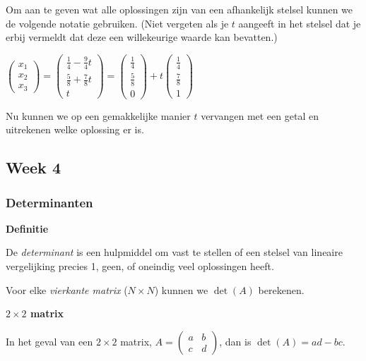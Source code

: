 \documentclass[11pt]{article}
\begin{document}
    Om aan te geven wat alle oplossingen zijn van een afhankelijk stelsel
kunnen we de volgende notatie gebruiken. (Niet vergeten als je \(t\)
aangeeft in het stelsel dat je erbij vermeldt dat deze een willekeurige
waarde kan bevatten.)

\(\begin{pmatrix}x_1 \\ x_2 \\ x_3 \end{pmatrix} = \begin{pmatrix} \frac{1}{4}-\frac{9}{4}t \\ \frac{5}{8}+\frac{7}{8}t \\ t \end{pmatrix} = \begin{pmatrix}\frac{1}{4}\\\frac{5}{8}\\0\end{pmatrix}+t\begin{pmatrix}\frac{1}{4}\\\frac{7}{8}\\1\end{pmatrix}\)

Nu kunnen we op een gemakkelijke manier \(t\) vervangen met een getal en
uitrekenen welke oplossing er is.

    \hypertarget{week-4}{%
\subsection{Week 4}\label{week-4}}

    \hypertarget{determinanten}{%
\subsubsection{Determinanten}\label{determinanten}}

    \textbf{Definitie}

De \emph{determinant} is een hulpmiddel om vast te stellen of een
stelsel van lineaire vergelijking precies 1, geen, of oneindig veel
oplossingen heeft.

Voor elke \emph{vierkante matrix} (\(N \times N\)) kunnen we \(\det(A)\)
berekenen.

\textbf{\(2 \times 2\) matrix}

In het geval van een \(2 \times 2\) matrix,
\(A=\begin{pmatrix}a&b\\c&d\end{pmatrix}\), dan is \(\det(A) = ad-bc\).
\end{document}
